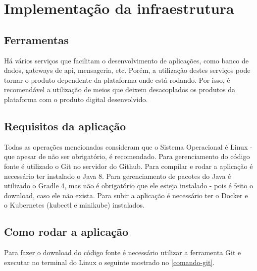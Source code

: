 \chapter{Implementação da infraestrutura}\label{implementação-da-infraestrutura}

\section{Ferramentas}\label{ferramentas}


Há vários serviços que facilitam o desenvolvimento de aplicações, como banco de dados,
gateways de api, mensageria, etc. Porém, a utilização destes serviços pode
tornar o produto dependente da plataforma onde está rodando. Por isso, é recomendável
a utilização de meios que deixem desacoplados os produtos da plataforma com o produto
digital desenvolvido.





\section{Requisitos da aplicação}\label{requisitos-da-aplicacao}

Todas as operações mencionadas consideram que o Sistema Operacional é Linux
- que apesar de não ser obrigatório, é recomendado.
Para gerenciamento do código fonte é utilizado o Git no servidor do Github.
Para compilar e rodar a aplicação é necessário ter instalado o Java 8.
Para gerenciamento de pacotes do Java é utilizado o Gradle 4, mas não
é obrigatório que ele esteja instalado - pois é feito o download, caso
ele não exista. Para subir a aplicação é necessário ter o Docker e o
Kubernetes (kubectl e minikube) instalados.


\section{Como rodar a aplicação}\label{como-rodar-a-aplicacao}

Para fazer o download do código fonte é necessário utilizar a ferramenta Git
e executar no terminal do Linux o seguinte mostrado no \autoref{comando-git}.


